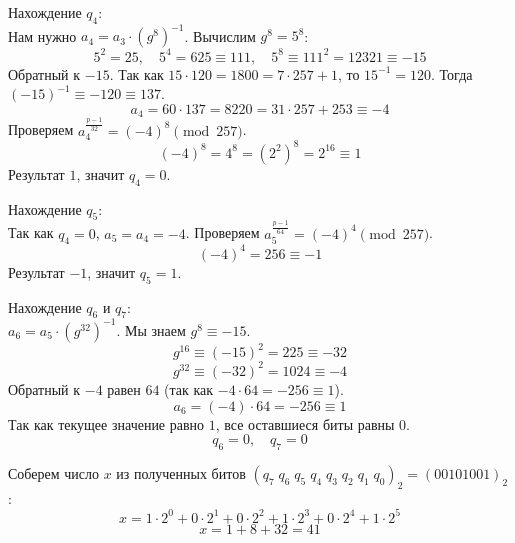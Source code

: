 \documentclass[12pt]{article}
\begin{document}
\begin{flushleft}
    \vspace{20pt}
    Нахождение $q_4$: \\
    Нам нужно $a_4 = a_3 \cdot (g^8)^{-1}$.
    Вычислим $g^8 = 5^8$:
    \[5^2 = 25, \quad 5^4 = 625 \equiv 111, \quad 5^8 \equiv 111^2 = 12321 \equiv -15\]
    Обратный к $-15$. Так как $15 \cdot 120 = 1800 = 7 \cdot 257 + 1$, то $15^{-1} = 120$.
    Тогда $(-15)^{-1} \equiv -120 \equiv 137$.
    \[a_4 = 60 \cdot 137 = 8220 = 31 \cdot 257 + 253 \equiv -4\]
    Проверяем $a_4^{\frac{p-1}{32}} = (-4)^8 \pmod{257}$.
    \[ (-4)^8 = 4^8 = (2^2)^8 = 2^{16} \equiv 1 \]
    Результат $1$, значит \textbf{$q_4 = 0$}.

    \vspace{20pt}
    Нахождение $q_5$: \\
    Так как $q_4=0$, $a_5 = a_4 = -4$.
    Проверяем $a_5^{\frac{p-1}{64}} = (-4)^4 \pmod{257}$.
    \[ (-4)^4 = 256 \equiv -1 \]
    Результат $-1$, значит \textbf{$q_5 = 1$}.

    \vspace{20pt}
    Нахождение $q_6$ и $q_7$: \\
    $a_6 = a_5 \cdot (g^{32})^{-1}$.
    Мы знаем $g^8 \equiv -15$.
    \[g^{16} \equiv (-15)^2 = 225 \equiv -32\]
    \[g^{32} \equiv (-32)^2 = 1024 \equiv -4\]
    Обратный к $-4$ равен $64$ (так как $-4 \cdot 64 = -256 \equiv 1$).
    \[a_6 = (-4) \cdot 64 = -256 \equiv 1\]
    Так как текущее значение равно $1$, все оставшиеся биты равны $0$.
    \[q_6 = 0, \quad q_7 = 0\]

    Соберем число $x$ из полученных битов $(q_7 \; q_6 \; q_5 \; q_4 \; q_3 \; q_2 \; q_1 \; q_0)_2 = (00101001)_2$:
    \[ x = 1 \cdot 2^0 + 0 \cdot 2^1 + 0 \cdot 2^2 + 1 \cdot 2^3 + 0 \cdot 2^4 + 1 \cdot 2^5 \]
    \[ x = 1 + 8 + 32 = 41 \]

\end{flushleft}


\newpage
\end{document}
